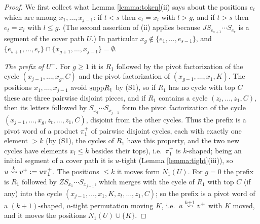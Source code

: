\documentclass{amsart}
\theoremstyle{definition}
\theoremstyle{remark}
\numberwithin{equation}{section}
\newcommand{\xrightsquigarrow}[2][]{%
	\mathrel{\mathop{\rightsquigarrow}\limits^{\scriptstyle #2}%
	\ifx\hfuzz#1\hfuzz\else_{\scriptstyle #1}\fi}%
}
\newcommand{\tom}[1]{\ensuremath{\xrightsquigarrow{#1}}}
\begin{document}
\begin{proof}
We first collect what Lemma \ref{lemma:token}(ii) says about the positions $e_t$ which are among $x_1,\ldots,x_{j-1}$: if $t<s$ then $e_t=x_l$ with $l>g$, and if $t>s$ then $e_t=x_l$ with $l\leq g$. (The second assertion of (ii) applies because $JS_{e_{s+1}}\cdots S_{e_r}$ is a segment of the cover path $U$.) In particular $x_g\notin\{e_1,\ldots,e_{s-1}\}$, and $\{e_{s+1},\ldots,e_r\}\cap\{x_{g+1},\ldots,x_{j-1}\}=\emptyset$.

\emph{The prefix of $U^+$.} For $g\geq1$ it is $R_1$ followed by the pivot factorization of the cycle $(x_{j-1},\ldots,x_g,C)$ and the pivot factorization of $(x_{g-1},\ldots,x_1,K)$. The positions $x_1,\ldots,x_{j-1}$ avoid $\mathrm{supp} R_1$ by (S1), so if $R_1$ has no cycle with top $C$ these are three pairwise disjoint pieces, and if $R_1$ contains a cycle $(z_t,\ldots,z_1,C)$, then its letters followed by $S_{x_g}\cdots S_{x_{j-1}}$ form the pivot factorization of the cycle $(x_{j-1},\ldots,x_g,z_t,\ldots,z_1,C)$, disjoint from the other cycles. Thus the prefix is a pivot word of a product $\pi_1^+$ of pairwise disjoint cycles, each with exactly one element $>k$ (by (S1), the cycles of $R_1$ have this property, and the two new cycles have elements $x_l\leq k$ besides their tops), i.e.\ $\pi_1^+$ is $k$-shaped; being an initial segment of a cover path it is $u$-tight (Lemma \ref{lemma:tight}(iii)), so $u\tom{k}v^+:=u\pi_1^+$. The positions $\leq k$ it moves form $N_1(U)$. For $g=0$ the prefix is $R_1$ followed by $Z S_{x_1}\cdots S_{x_{j-1}}$, which merges with the cycle of $R_1$ with top $C$ (if any) into the cycle $(x_{j-1},\ldots,x_1,K,z_t,\ldots,z_1,C)$; so the prefix is a pivot word of a $(k+1)$-shaped, $u$-tight permutation moving $K$, i.e.\ $u\tom{k+1}v^+$ with $K$ moved, and it moves the positions $N_1(U)\cup\{K\}$.


\end{proof}
\end{document}
